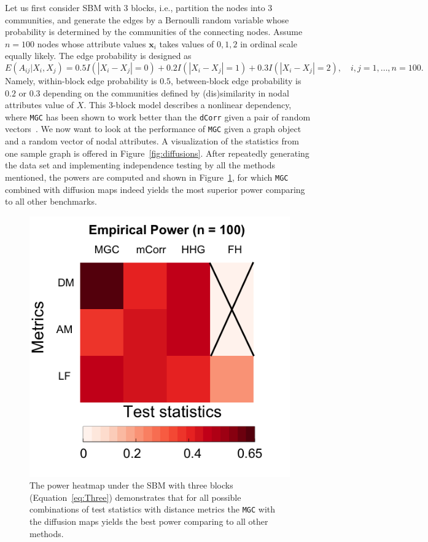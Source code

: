 \documentclass[11pt]{article}
\theoremstyle{definition}
\begin{document}
Let us first consider SBM with $3$ blocks, i.e., partition the nodes into $3$ communities, and generate the edges by a Bernoulli random variable whose probability is determined by the communities of the connecting nodes. Assume $n=100$ nodes whose attribute values $\mathbf{x}_i$ takes values of $0,1,2$ in ordinal scale equally likely. The edge probability is designed as
\begin{equation}
\label{eq:Three}
E(A_{ij} | X_{i}, X_{j}) = 0.5 I(|X_{i} - X_{j}| = 0) + 0.2 I(|X_{i} - X_{j}| = 1) + 0.3 I(|X_{i} - X_{j}| = 2), \quad i,j = 1, \ldots, n = 100.
\end{equation} 
Namely, within-block edge probability is $0.5$, between-block edge probability is $0.2$ or $0.3$ depending on the communities defined by (dis)similarity in nodal attributes value of $X$. This 3-block model describes a nonlinear dependency, where \texttt{MGC} has been shown to work better than the \texttt{dCorr} given a pair of random vectors~\cite{shen2016discovering}. We now want to look at the performance of \texttt{MGC} given a graph object and a random vector of nodal attributes. A visualization of the statistics from one sample graph is offered in Figure~\ref{fig:diffusions}. After repeatedly generating the data set and implementing independence testing by all the methods mentioned, the powers are computed and shown in Figure~\ref{fig:threeSBM}, for which \texttt{MGC} combined with diffusion maps indeed yields the most superior power comparing to all other benchmarks.

\begin{figure}
	\centering
	\includegraphics[width=0.4\paperwidth, height=0.4\paperwidth]{ThreeSBM.png}
	\caption{The power heatmap under the SBM with three blocks (Equation~\ref{eq:Three}) demonstrates that for all possible combinations of test statistics with distance metrics the \texttt{MGC} with the diffusion maps yields the best power comparing to all other methods.}
	\label{fig:threeSBM}
\end{figure}
\end{document}
